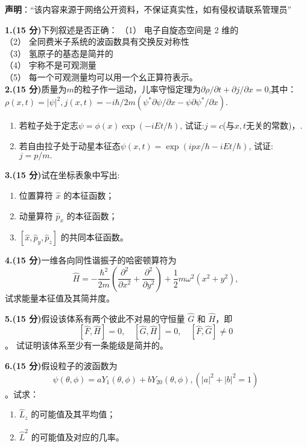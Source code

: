 
\textbf{声明}：“该内容来源于网络公开资料，不保证真实性，如有侵权请联系管理员”

\textbf{1.(15 分)}下列叙述是否正确：
（1） 电子自旋态空间是 2 维的\\
（2） 全同费米子系统的波函数具有交换反对称性\\
（3） 氢原子的基态是简并的\\
（4） 宇称不是可观测量\\
（5） 每一个可观测量均可以用一个幺正算符表示。\\

\textbf{2.(15 分)}质量为$m$的粒子作一运动，儿率守恒定理为$\partial \rho/\partial t + \partial j/\partial x = 0$,其中：$\rho(x, t) = |\psi|^2,j(x, t) = -i\hbar/2m \left( \psi^* \partial \psi/\partial x - \psi \partial \psi^*/\partial x \right).$
\begin{enumerate}
\item 若粒子处于定志$\psi = \phi(x) \exp(-iEt/\hbar)$, 试证:$j=c$(与$x,t$无关的常数)，.
\item 若自由拉子处于动星本征态$\psi(x, t) = \exp(ipx/\hbar - iEt/\hbar)$, 试证: $j = p/m.$
\end{enumerate}

\textbf{3.(15 分)}试在坐标表象中写出:
\begin{enumerate}
        \item 位置算符 $\hat{x}$ 的本征函数；
        \item 动量算符 $\hat{p}_x$ 的本征函数；
        \item $[\hat{x}, \hat{p}_y,\hat{p}_z]$ 的共同本征函数。
    \end{enumerate}

\textbf{4.(15 分)}一维各向同性谐振子的哈密顿算符为$$\hat{H} = -\frac{\hbar^2}{2m} \left( \frac{\partial^2}{\partial x^2} + \frac{\partial^2}{\partial y^2} \right) + \frac{1}{2} m\omega^2 \left( x^2 + y^2 \right),~$$
试求能量本征值及其简并度。

\textbf{5.(15 分)}假设该体系有两个彼此不对易的守恒量 $\hat{G}$ 和 $\hat{H}$，即
$$\left[\hat{F}, \hat{H}\right] = 0, \quad \left[\hat{G}, \hat{H}\right] = 0, \quad \left[\hat{F}, \hat{G}\right] \neq 0~$$。
试证明该体系至少有一条能级是简并的。

\textbf{6.(15 分)}假设粒子的波函数为
$$\psi(\theta, \phi) = a Y_1(\theta, \phi) + b Y_{20}(\theta, \phi),
(\lvert a \rvert^2 + \lvert b \rvert^2 = 1)~$$。试求：
\begin{enumerate}
    \item $\hat{L}_z$ 的可能值及其平均值；
    \item $\hat{L}^2$ 的可能值及对应的几率。
\end{enumerate}

